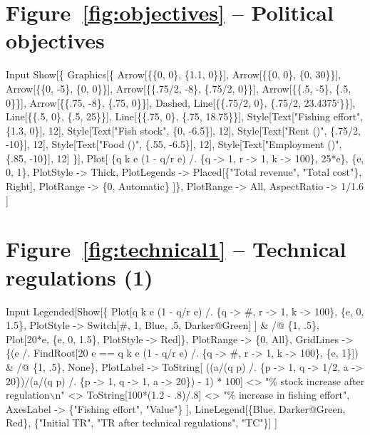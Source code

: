 \documentclass[11pt,fleqn]{book} %
\begin{document}
\section*{Figure~\ref{fig:objectives} -- Political objectives }
\small{
\begin{mmaCell}[index=1]{Input}
  Show[\{
    Graphics[\{
      Arrow[\{\{0, 0\}, \{1.1, 0\}\}],
      Arrow[\{\{0, 0\}, \{0, 30\}\}],
      Arrow[\{\{0, -5\}, \{0, 0\}\}],
      Arrow[\{\{.75/2, -8\}, \{.75/2, 0\}\}],
      Arrow[\{\{.5, -5\}, \{.5, 0\}\}],
      Arrow[\{\{.75, -8\}, \{.75, 0\}\}],
      Dashed,
      Line[\{\{.75/2, 0\}, \{.75/2, 23.4375`\}\}],
      Line[\{\{.5, 0\}, \{.5, 25\}\}],
      Line[\{\{.75, 0\}, \{.75, 18.75\}\}],
      Style[Text["Fishing effort", \{1.3, 0\}], 12],
      Style[Text["Fish stock", \{0, -6.5\}], 12],
      Style[Text["Rent ()", \{.75/2, -10\}], 12],
      Style[Text["Food ()", \{.55, -6.5\}], 12],
      Style[Text["Employment ()", \{.85, -10\}], 12]
    \}],
    Plot[
      \{q k e (1 - q/r e) /. \{q -> 1, r -> 1, k -> 100\}, 25*e\},
      \{e, 0, 1\},
      PlotStyle   -> Thick,
      PlotLegends -> Placed[\{"Total revenue", "Total cost"\}, Right],
      PlotRange   -> \{0, Automatic\}
    ]\},
    PlotRange     -> All,
    AspectRatio   -> 1/1.6
  ] 
\end{mmaCell}
}

\section*{Figure~\ref{fig:technical1} -- Technical regulations (1) }
\small{
\begin{mmaCell}[index=1]{Input}
  Legended[Show[\{
      Plot[q k e (1 - q/r e) /. \{q -> #, r -> 1, k -> 100\}, \{e, 0, 1.5\}, 
        PlotStyle -> Switch[#, 1, Blue, .5, Darker@Green]
      ] & /@ \{1, .5\},
      Plot[20*e, \{e, 0, 1.5\}, PlotStyle -> Red]\},
      PlotRange -> \{0, All\},
      GridLines -> \{(e /. FindRoot[20 e == q k e (1 - q/r e) /. 
        \{q -> #, r -> 1, k -> 100\}, \{e, 1\}]) & /@ \{1, .5\}, None\},
      PlotLabel -> ToString[
        ((a/(q p) /. \{p -> 1, q -> 1/2, a -> 20\})/(a/(q p) /. 
          \{p -> 1, q -> 1, a -> 20\}) - 1) * 100] <> 
          "\% stock increase after regulation\(\backslash\)n" <> 
          ToString[100*(1.2 - .8)/.8] <> "\% increase in fishing effort",
      AxesLabel -> \{"Fishing effort", "Value"\}
    ], 
    LineLegend[\{Blue, Darker@Green, Red\}, 
      \{"Initial TR", "TR after technical regulations", "TC"\}]
  ]
\end{mmaCell}
}
\end{document}

